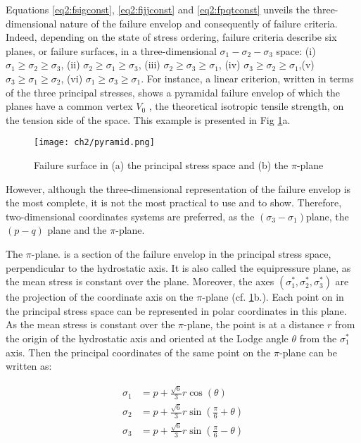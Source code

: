 Equations \ref{eq2:fsigconst}, \ref{eq2:fijjconst} and \ref{eq2:fpqtconst} unveils the three-dimensional nature of the failure envelop and consequently of failure criteria. Indeed, depending on the state of stress ordering, failure criteria describe six planes, or failure surfaces, in a three-dimensional $\sigma_1 -\sigma_2 -\sigma_3$  space: (i) $\sigma_1 \geq \sigma_2 \geq \sigma_3$, (ii) $\sigma_2 \geq \sigma_1 \geq \sigma_3$, (iii) $\sigma_2 \geq \sigma_3 \geq \sigma_1$, (iv) $\sigma_3 \geq \sigma_2 \geq \sigma_1$,(v) $\sigma_3 \geq \sigma_1 \geq \sigma_2$, (vi) $\sigma_1 \geq \sigma_3 \geq \sigma_1$. For instance, a linear criterion, written in terms of the three principal stresses, shows a pyramidal failure envelop of which the planes have a common vertex $V_0$ , the theoretical isotropic tensile strength, on the tension side of the space. This example is presented in Fig \ref{fig2:pyramid}a.  

\begin{figure}[tb]
    \centering
    \texttt{[image: ch2/pyramid.png]}
    \caption{Failure surface in (a) the principal stress space and (b) the $\pi$-plane \cite[Labuz 2018]{Labuz2018}}
    \label{fig2:pyramid}
\end{figure}

However, although the three-dimensional representation of the failure envelop is the most complete, it is not the most practical to use and to show. Therefore, two-dimensional coordinates systems are preferred, as the  $(\sigma_3 -\sigma_1)$plane, the  $(p-q)$ plane and the $\pi$-plane.  

The $\pi$-plane. is a section of the failure envelop in the principal stress space, perpendicular to the hydrostatic axis. It is also called the equipressure plane, as the mean stress is constant over the plane. Moreover, the axes $(\sigma_1^*,\sigma_2^*,\sigma_3^*)$ are the projection of the coordinate axis on the $\pi$-plane (cf. \ref{fig2:pyramid}b.). Each point on in the principal stress space can be represented in polar coordinates in this plane. As the mean stress is constant over the $\pi$-plane, the point is at a distance $r$ from the origin of the hydrostatic axis and oriented at the Lodge angle $\theta$ from the  $\sigma_1^*$ axis. Then the principal coordinates of the same point on the $\pi$-plane can be written as: 

\begin{align}
    \sigma_1 &= p + \frac{\sqrt{6}}{3}r\cos\left(\theta\right) \label{eq2:sig1}\\
    \sigma_2 &= p + \frac{\sqrt{6}}{3}r\sin\left(\frac{\pi}{6}+\theta\right)\\
    \sigma_3 &= p + \frac{\sqrt{6}}{3}r\sin\left(\frac{\pi}{6}-\theta\right) \label{eq2:sig3}
\end{align}

